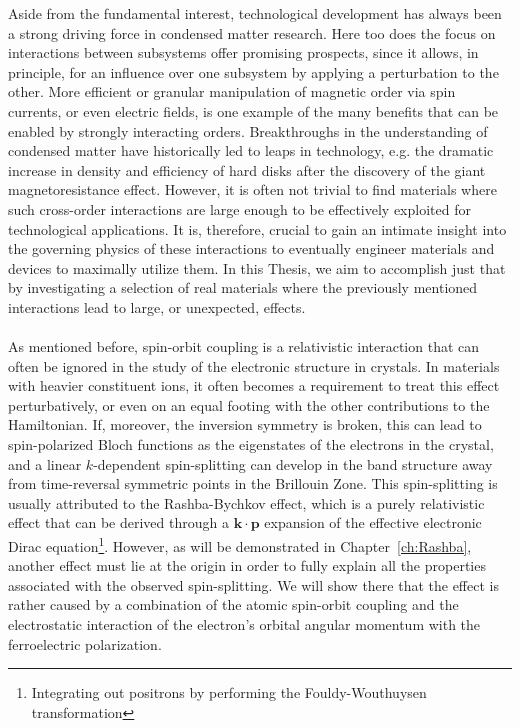 Aside from the fundamental interest, technological development has always been a strong driving force in condensed matter research. Here too does the focus on interactions between subsystems offer promising prospects, since it allows, in principle, for an influence over one subsystem by applying a perturbation to the other.
More efficient or granular manipulation of magnetic order via spin currents, or even electric fields, is one example of the many benefits that can be enabled by strongly interacting orders.
Breakthroughs in the understanding of condensed matter have historically led to leaps in technology, e.g. the dramatic increase in density and efficiency of hard disks after the discovery of the giant magnetoresistance effect.
However, it is often not trivial to find materials where such cross-order interactions are large enough to be effectively exploited for technological applications.
It is, therefore, crucial to gain an intimate insight into the governing physics of these interactions to eventually engineer materials and devices to maximally utilize them.
In this Thesis, we aim to accomplish just that by investigating a selection of real materials where the previously mentioned interactions lead to large, or unexpected, effects.
\\\\
As mentioned before, spin-orbit coupling is a relativistic interaction that can often be ignored in the study of the electronic structure in crystals.
In materials with heavier constituent ions, it often becomes a requirement to treat this effect perturbatively, or even on an equal footing with the other contributions to the Hamiltonian.
If, moreover, the inversion symmetry is broken, this can lead to spin-polarized Bloch functions as the eigenstates of the electrons in the crystal, and a linear $k$-dependent spin-splitting can develop in the band structure away from time-reversal symmetric points in the Brillouin Zone.
This spin-splitting is usually attributed to the Rashba-Bychkov effect, which is a purely relativistic effect that can be derived through a $\bm{k}\cdot \bm{p}$ expansion of the effective electronic Dirac equation\footnote{Integrating out positrons by performing the Fouldy-Wouthuysen transformation}.
However, as will be demonstrated in Chapter~\ref{ch:Rashba}, another effect must lie at the origin in order to fully explain  all the properties associated with the observed spin-splitting.
We will show there that the effect is rather caused by a combination of the atomic spin-orbit coupling and the electrostatic interaction of the electron's orbital angular momentum with the ferroelectric polarization.
